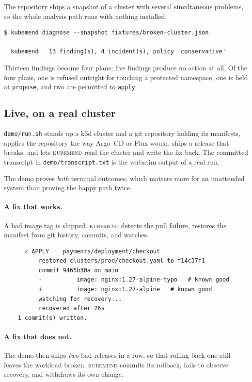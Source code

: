 \documentclass[11pt,a4paper]{article}
\newcommand{\code}[1]{\texttt{\small #1}}
\newcommand{\kubemend}{\textsc{kubemend}}
\begin{document}
The repository ships a snapshot of a cluster with several simultaneous problems,
so the whole analysis path runs with nothing installed.

\begin{lstlisting}
$ kubemend diagnose --snapshot fixtures/broken-cluster.json

  kubemend   13 finding(s), 4 incident(s), policy 'conservative'
\end{lstlisting}

Thirteen findings become four plans; five findings produce no action at all. Of
the four plans, one is refused outright for touching a protected namespace, one
is held at \code{propose}, and two are permitted to \code{apply}.

\subsection{Live, on a real cluster}

\code{demo/run.sh} stands up a k3d cluster and a git repository holding its
manifests, applies the repository the way Argo~CD or Flux would, ships a release
that breaks, and lets \kubemend{} read the cluster and write the fix back. The
committed transcript in \code{demo/transcript.txt} is the verbatim output of a
real run.

The demo proves \emph{both} terminal outcomes, which matters more for an
unattended system than proving the happy path twice.

\paragraph{A fix that works.} A bad image tag is shipped. \kubemend{} detects the
pull failure, restores the manifest from git history, commits, and watches.

\begin{lstlisting}
      ✓ APPLY    payments/deployment/checkout
          restored clusters/prod/checkout.yaml to f14c37f1
          commit 9465b30a on main
          -          image: nginx:1.27-alpine-typo   # known good
          +          image: nginx:1.27-alpine   # known good
          watching for recovery...
          recovered after 26s
    1 commit(s) written.
\end{lstlisting}

\paragraph{A fix that does not.} The demo then ships \emph{two} bad releases in a
row, so that rolling back one still leaves the workload broken. \kubemend{}
commits its rollback, fails to observe recovery, and withdraws its own change.
\end{document}
